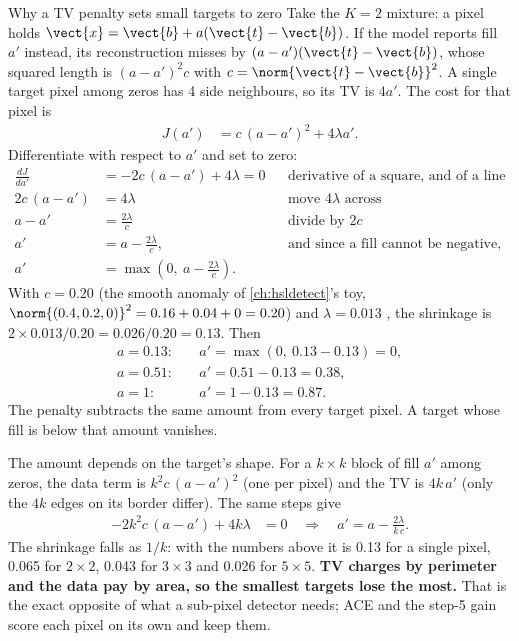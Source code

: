 \begin{worked}[label={we:hslunmix:tv}]{Why a TV penalty sets small targets to zero}
Take the $K=2$ mixture: a pixel holds $\vect{x}=\vect{b}+a(\vect{t}-\vect{b})$. If the model reports fill $a'$
instead, its reconstruction misses by $(a-a')(\vect{t}-\vect{b})$, whose squared length is $(a-a')^2c$ with
$c=\norm{\vect{t}-\vect{b}}^2$. A single target pixel among zeros has 4 side neighbours, so its TV is $4a'$. The cost
for that pixel is
\begin{align*}
J(a') &= c\,(a-a')^2 + 4\lambda a' .
\end{align*}
Differentiate with respect to $a'$ and set to zero:
\begin{align*}
\frac{dJ}{da'} &= -2c\,(a-a') + 4\lambda = 0 && \text{derivative of a square, and of a line}\\
2c\,(a-a') &= 4\lambda && \text{move }4\lambda\text{ across}\\
a-a' &= \frac{2\lambda}{c} && \text{divide by }2c\\
a' &= a-\frac{2\lambda}{c}, && \text{and since a fill cannot be negative,}\\
a' &= \max\!\left(0,\ a-\frac{2\lambda}{c}\right).
\end{align*}
With $c=0.20$ (the smooth anomaly of \cref{ch:hsldetect}'s toy, $\norm{(0.4,0.2,0)}^2=0.16+0.04+0=0.20$) and $\lambda=0.013$
\tagA, the shrinkage is $2\times0.013/0.20=0.026/0.20=0.13$. Then\tagC
\begin{align*}
a=0.13:&\quad a'=\max(0,\ 0.13-0.13)=0,\\
a=0.51:&\quad a'=0.51-0.13=0.38,\\
a=1:&\quad a'=1-0.13=0.87 .
\end{align*}
The penalty subtracts the same amount from every target pixel. A target whose fill is below that amount vanishes.
\end{worked}

The amount depends on the target's shape. For a $k\times k$ block of fill $a'$ among zeros, the data term is $k^2c\,(a-a')^2$
(one per pixel) and the TV is $4k\,a'$ (only the $4k$ edges on its border differ). The same steps give
\begin{align*}
-2k^2c\,(a-a')+4k\lambda &= 0 \quad\Longrightarrow\quad a' = a-\frac{2\lambda}{k\,c}.
\end{align*}
The shrinkage falls as $1/k$: with the numbers above it is 0.13 for a single pixel, 0.065 for $2\times2$, 0.043 for $3\times3$
and 0.026 for $5\times5$\tagC. \textbf{TV charges by perimeter and the data pay by area, so the smallest targets lose the
most.} That is the exact opposite of what a sub-pixel detector needs; ACE and the step-5 gain score each pixel on its own and
keep them.

